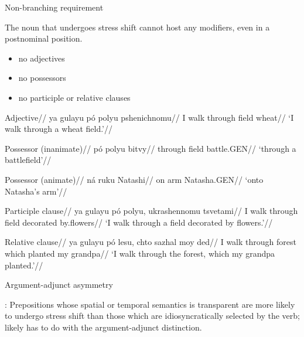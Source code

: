 \documentclass{beamer}
\begin{document}
	\begin{frame}{Non-branching requirement}

		The noun that undergoes stress shift cannot host any modifiers, even in a postnominal position.
		
		\begin{itemize}
			\item no adjectives
			\item no possessors
			\item no participle or relative clauses
		\end{itemize}

	\end{frame}

	\begin{frame}
	
		\ex
			\begingl 
				\glpreamble Adjective//
				\gla *ya gulayu pó polyu pshenichnomu//
				\glb I walk through field wheat//
				\glft `I walk through a wheat field.'//
			\endgl
		\xe

	\end{frame}
	
	\begin{frame}
	
		\ex
			\begingl 
				\glpreamble Possessor (inanimate)//
				\gla *pó polyu bitvy//
				\glb through field battle.GEN//
				\glft `through a battlefield'//
			\endgl
		\xe
		
		\ex
			\begingl 
				\glpreamble Possessor (animate)//
				\gla *ná ruku Natashi//
				\glb on arm Natasha.GEN//
				\glft `onto Natasha's arm'//
			\endgl
		\xe


	\end{frame}

	\begin{frame}
	
		\ex
			\begingl 
				\glpreamble Participle clause//
				\gla *ya gulayu pó polyu, ukrashennomu tsvetami//
				\glb I walk through field decorated by.flowers//
				\glft `I walk through a field decorated by flowers.'//
			\endgl
		\xe
		
		\ex
			\begingl 
				\glpreamble Relative clause//
				\gla *ya gulayu pó lesu, chto sazhal moy ded//
				\glb I walk through forest which planted my grandpa//
				\glft `I walk through the forest, which my grandpa planted.'//
			\endgl
		\xe

	\end{frame}
	
	\begin{frame}{Argument-adjunct asymmetry}

		\textcite{Blumenfeld:2011}: Prepositions whose spatial or temporal semantics is transparent are
more likely to undergo stress shift than those which are idiosyncratically selected by the verb; likely has to do with the argument-adjunct distinction.

	\end{frame}
\end{document}
